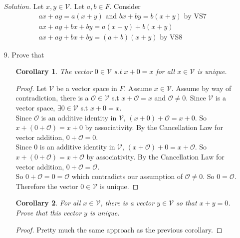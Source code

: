 \documentclass{article}
\theoremstyle{claim}
\newtheorem{corollary}{Corollary}[theorem]
\theoremstyle{definition}
\begin{document}
\begin{enumerate}
\begin{enumerate}
            \item[] \emph{Solution. } Let $x, y \in \mathcal{V}$. Let $a, b \in F$. Consider
                \begin{gather*}
                    ax + ay = a(x + y) \text{ and } bx + by = b(x + y) \text{ by VS7 }\\
                    ax + ay + bx + by = a(x + y) + b(x + y)\\
                    ax + ay + bx + by = (a + b)(x + y) \text{ by VS8 }
                \end{gather*}
            \item[9.] Prove that
                \begin{enumerate}
                    \item[]\begin{corollary}
                        The vector $0 \in \mathcal{V}$ s.t $x + 0 = x$ for all $x \in \mathcal{V}$ is unique.
                    \end{corollary}
                    \begin{proof}
                        Let $\mathcal{V}$ be a vector space in $F$. Assume $x \in \mathcal{V}$. Assume by way of contradiction, there is a $\mathcal{O} \in \mathcal{V}$ s.t $x + \mathcal{O} = x$ and $\mathcal{O} \ne 0$. Since $\mathcal{V}$ is a vector space, $\exists 0 \in \mathcal{V}$ s.t $x + 0 = x$.\\
                        Since $\mathcal{O}$ is an additive identity in $\mathcal{V}$, $(x + 0) + \mathcal{O} = x + 0$. So $x + (0 + \mathcal{O}) = x + 0$ by associativity. By the Cancellation Law for vector addition, $0 + \mathcal{O} = 0$.\\
                        Since $0$ is an additive identity in $\mathcal{V}$, $(x + \mathcal{O}) + 0 = x + \mathcal{O}$. So $x + (0 + \mathcal{O}) = x + \mathcal{O}$ by associativity. By the Cancellation Law for vector addition, $0 + \mathcal{O} = \mathcal{O}$.\\
                        So $0 + \mathcal{O} = 0 = \mathcal{O}$ which contradicts our assumption of $\mathcal{O} \ne 0$. So $0 = \mathcal{O}$. Therefore the vector $0 \in \mathcal{V}$ is unique.
                    \end{proof}
                    \item[]\begin{corollary}
                        For all $x \in \mathcal{V}$, there is a vector $y \in \mathcal{V}$ so that $x + y = 0$. Prove that this vector $y$ is unique.
                    \end{corollary}
                    \begin{proof}
                        Pretty much the same approach as the previous corollary.
                    \end{proof}
                \end{enumerate}
        \end{enumerate}
\end{enumerate}
\end{document}
